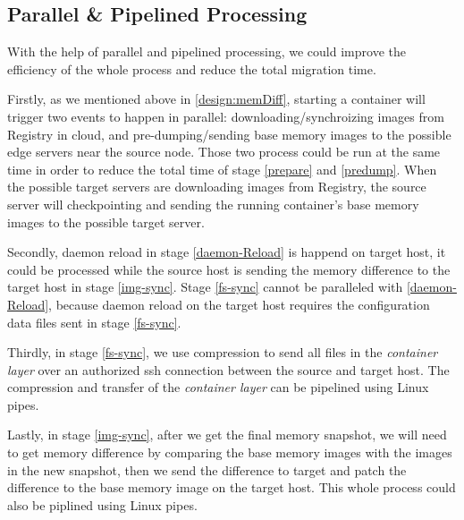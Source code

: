 





\subsection{Parallel \&  Pipelined Processing}\label{design:pipe}

With the help of parallel and pipelined processing,  we could improve the efficiency of the whole process and reduce the total migration time.


Firstly, as we mentioned above in \ref{design:memDiff}, starting a container will trigger two events to happen in parallel: downloading/synchroizing images from Registry in cloud, and pre-dumping/sending base memory images to the possible edge servers near the source node. Those two process could be run at the same time in order to reduce the total time of stage \ref{prepare} and \ref{predump}. When the possible target servers are downloading images from Registry, the source server will checkpointing and sending the running container's base memory images to the possible target server.

Secondly, daemon reload in stage \ref{daemon-Reload} is happend on target host, it could be processed while the source host is sending the memory difference to the target host in stage \ref{img-sync}. Stage \ref{fs-sync} cannot be paralleled with \ref{daemon-Reload}, because daemon reload on the target host requires the configuration data files sent in stage \ref{fs-sync}.

Thirdly,
in stage \ref{fs-sync}, we use compression to send all files in the \textit{container layer} over an authorized ssh connection between the source and target host. The compression and transfer of the \textit{container layer} can be pipelined using Linux pipes.

Lastly, in stage \ref{img-sync}, after we get the final memory snapshot, we will need to get memory difference by comparing the base memory images with the images in the new snapshot, then we send the difference to target and patch the difference to the base memory image on the target host. This whole process could also be piplined using Linux pipes. 
